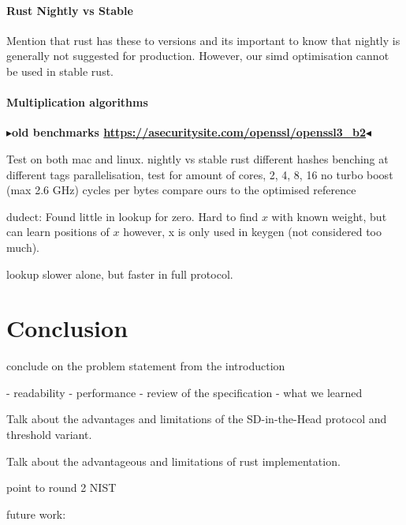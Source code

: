 \documentclass[11pt]{report}
\theoremstyle{definition}
\theoremstyle{plain}
\newcommand{\todo}[1]{{\color[rgb]{.5,0,0}\textbf{$\blacktriangleright$#1$\blacktriangleleft$}}}
\begin{document}
\subsubsection{Rust Nightly vs Stable}

Mention that rust has these to versions and its important to know that nightly is generally not suggested for production. However, our simd optimisation cannot be used in stable rust.

\subsubsection{Multiplication algorithms}

\todo{old benchmarks \url{https://asecuritysite.com/openssl/openssl3_b2}}

Test on both mac and linux.
nightly vs stable rust
different hashes
benching at different tags
parallelisation, test for amount of cores, 2, 4, 8, 16
no turbo boost (max 2.6 GHz)
cycles per bytes
compare ours to the optimised reference

dudect: Found little in lookup for zero. Hard to find $x$ with known weight, but can learn positions of $x$ however, x is only used in keygen (not considered too much).

lookup slower alone, but faster in full protocol.


\chapter{Conclusion}\label{ch:conclusion}

conclude on the problem statement from the introduction

- readability
- performance
- review of the specification
- what we learned

Talk about the advantages and limitations of the SD-in-the-Head protocol and threshold variant.

Talk about the advantageous and limitations of rust implementation.



point to round 2 NIST

future work:
\end{document}
